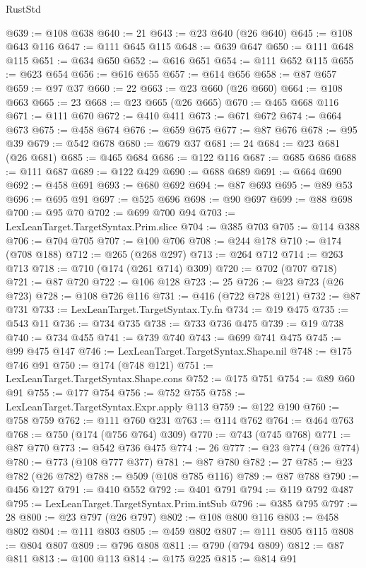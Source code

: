 \begin{lexlean}{RustStd}
\begin{coremodule}
{\begin{coremodule}
{{{{{{{{{{{{{{{{{{{{{{{{{{{{{{{{{{{{{{{{{{{{{{{{{{{{{{{{{{{{{{{{{{{{{{{{{{{{{{@639 := @108 @638
@640 := 21
@643 := @23 @640 (@26 @640)
@645 := @108 @643 @116
@647 := @111 @645 @115
@648 := @639 @647
@650 := @111 @648 @115
@651 := @634 @650
@652 := @616 @651
@654 := @111 @652 @115
@655 := @623 @654
@656 := @616 @655
@657 := @614 @656
@658 := @87 @657
@659 := @97 @37
@660 := 22
@663 := @23 @660 (@26 @660)
@664 := @108 @663
@665 := 23
@668 := @23 @665 (@26 @665)
@670 := @465 @668 @116
@671 := @111 @670
@672 := @410 @411
@673 := @671 @672
@674 := @664 @673
@675 := @458 @674
@676 := @659 @675
@677 := @87 @676
@678 := @95 @39
@679 := @542 @678
@680 := @679 @37
@681 := 24
@684 := @23 @681 (@26 @681)
@685 := @465 @684
@686 := @122 @116
@687 := @685 @686
@688 := @111 @687
@689 := @122 @429
@690 := @688 @689
@691 := @664 @690
@692 := @458 @691
@693 := @680 @692
@694 := @87 @693
@695 := @89 @53
@696 := @695 @91
@697 := @525 @696
@698 := @90 @697
@699 := @88 @698
@700 := @95 @70
@702 := @699 @700 @94
@703 := LexLeanTarget.TargetSyntax.Prim.slice
@704 := @385 @703
@705 := @114 @388
@706 := @704 @705
@707 := @100 @706
@708 := @244 @178
@710 := @174 (@708 @188)
@712 := @265 (@268 @297)
@713 := @264 @712
@714 := @263 @713
@718 := @710 (@174 (@261 @714) @309)
@720 := @702 (@707 @718)
@721 := @87 @720
@722 := @106 @128
@723 := 25
@726 := @23 @723 (@26 @723)
@728 := @108 @726 @116
@731 := @416 (@722 @728 @121)
@732 := @87 @731
@733 := LexLeanTarget.TargetSyntax.Ty.fn
@734 := @19 @475
@735 := @543 @11
@736 := @734 @735
@738 := @733 @736 @475
@739 := @19 @738
@740 := @734 @455
@741 := @739 @740
@743 := @699 @741 @475
@745 := @99 @475 @147
@746 := LexLeanTarget.TargetSyntax.Shape.nil
@748 := @175 @746 @91
@750 := @174 (@748 @121)
@751 := LexLeanTarget.TargetSyntax.Shape.cons
@752 := @175 @751
@754 := @89 @60 @91
@755 := @177 @754
@756 := @752 @755
@758 := LexLeanTarget.TargetSyntax.Expr.apply @113
@759 := @122 @190
@760 := @758 @759
@762 := @111 @760 @231
@763 := @114 @762
@764 := @464 @763
@768 := @750 (@174 (@756 @764) @309)
@770 := @743 (@745 @768)
@771 := @87 @770
@773 := @542 @736 @475
@774 := 26
@777 := @23 @774 (@26 @774)
@780 := @773 (@108 @777 @377)
@781 := @87 @780
@782 := 27
@785 := @23 @782 (@26 @782)
@788 := @509 (@108 @785 @116)
@789 := @87 @788
@790 := @456 @127
@791 := @410 @552
@792 := @401 @791
@794 := @119 @792 @487
@795 := LexLeanTarget.TargetSyntax.Prim.intSub
@796 := @385 @795
@797 := 28
@800 := @23 @797 (@26 @797)
@802 := @108 @800 @116
@803 := @458 @802
@804 := @111 @803
@805 := @459 @802
@807 := @111 @805 @115
@808 := @804 @807
@809 := @796 @808
@811 := @790 (@794 @809)
@812 := @87 @811
@813 := @100 @113
@814 := @175 @225
@815 := @814 @91
}}}}}}}}}}}}}}}}}}}}}}}}}}}}}}}}}}}}}}}}}}}}}}}}}}}}}}}}}}}}}}}}}}}}}}}}}}}}}}
\end{coremodule}}
\end{coremodule}
\end{lexlean}
